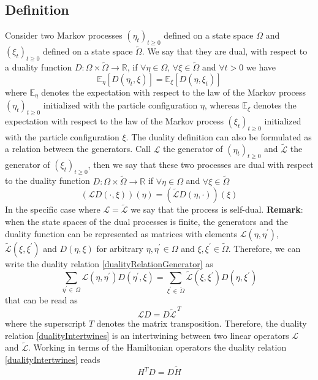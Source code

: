 \documentclass[10pt]{article}
\numberwithin{equation}{section}
\numberwithin{equation}{subsection}
\begin{document}
\subsection{Definition}
Consider two Markov processes $(\eta_{t})_{t\geq 0}$ defined on a state space $\Omega$ and $(\xi_{t})_{t\geq 0}$ defined on a state space $\widetilde{\Omega}$. We say that they are dual, with respect to a duality function $D:\Omega\times \widetilde{\Omega}\to \mathbb{R}$, if $\forall \eta\in\Omega$, $\forall \xi\in\widetilde{\Omega}$ and $\forall t> 0$ we have 
\begin{equation}\label{duality-expectation}
    \mathbb{E}_{\eta}\left[D(\eta_{t},\xi)\right]=\mathbb{E}_{\xi}\left[D(\eta,\xi_{t})\right]
\end{equation}
where $\mathbb{E}_{\eta}$ denotes the expectation with respect to the law of the Markov process $(\eta_{t})_{t\geq 0}$ initialized with the particle configuration $\eta$, whereas $\mathbb{E}_{\xi}$ denotes the expectation with respect to the law of the Markov process $(\xi_{t})_{t\geq 0}$ initialized with the particle configuration $\xi$.
The duality definition can also be formulated as a relation between the generators. Call $\mathcal{L}$ the generator of $(\eta_{t})_{t\geq0}$ and $\widetilde{\mathcal{L}}$ the generator of $(\xi_{t})_{t\geq 0}$, then we say that these two processes are dual with respect to the duality function $D:\Omega\times \widetilde{\Omega}\to \mathbb{R}$ if $\forall \eta\in\Omega$ and $\forall \xi\in\widetilde{\Omega}$
\begin{equation}\label{dualityRelationGenerator}
    \left(\mathcal{L}D(\cdot,\xi)\right)(\eta)=\left(\widetilde{\mathcal{L}}D(\eta,\cdot)\right)(\xi)
\end{equation}
In the specific case where $\mathcal{L}=\widetilde{\mathcal{L}}$ we say that the process is self-dual.
\newline
\newline
\textbf{Remark}:
when the state spaces of the dual processes is finite, the generators and the duality function can be represented as matrices with elements $\mathcal{L}(\eta,\eta^{'})$, $\widetilde{\mathcal{L}}(\xi,\xi^{'})$ and $D(\eta,\xi)$ for arbitrary $\eta,\eta^{'}\in\Omega$ and $\xi,\xi^{'}\in \widetilde{\Omega}$. Therefore, we can write the duality relation \eqref{dualityRelationGenerator} as 
\begin{equation}
    \sum_{\eta^{'}\in\,\Omega}\mathcal{L}(\eta,\eta^{'})D(\eta^{'},\xi)=\sum_{\xi^{'}\in\, \widetilde{\Omega}}\widetilde{\mathcal{L}}(\xi,\xi^{'})D(\eta,\xi^{'})
\end{equation}
that can be read as
\begin{equation}\label{dualityIntertwines}
    \mathcal{L}D=D\widetilde{\mathcal{L}}^{\,T}
\end{equation}
where the superscript $T$ denotes the matrix transposition. Therefore, the duality relation \eqref{dualityIntertwines} is an intertwining between two linear operators $\mathcal{L}$ and $\widetilde{\mathcal{L}}$. Working in terms of the Hamiltonian operators the duality relation \eqref{dualityIntertwines} reads 
\begin{equation}\label{DualityRelation}
    H^{T}D=D\widetilde{H}
\end{equation}
\end{document}
